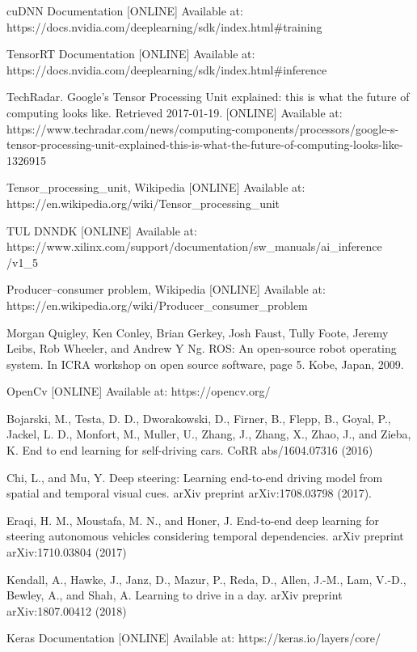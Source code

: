 \documentclass[conference]{IEEEtran}
\begin{document}
\begin{thebibliography}{00}
 cuDNN Documentation [ONLINE] Available at: https://docs.nvidia.com/deeplearning/sdk/index.html\#training

 TensorRT Documentation [ONLINE] Available at: https://docs.nvidia.com/deeplearning/sdk/index.html\#inference

 TechRadar. Google's Tensor Processing Unit explained: this is what the future of computing looks like. Retrieved 2017-01-19. [ONLINE] Available at: https://www.techradar.com/news/computing-components/processors/google-s-tensor-processing-unit-explained-this-is-what-the-future-of-computing-looks-like-1326915

 Tensor\_processing\_unit, Wikipedia [ONLINE] Available at: https://en.wikipedia.org/wiki/Tensor\_processing\_unit

 TUL DNNDK [ONLINE] Available at: https://www.xilinx.com/support/documentation/sw\_manuals/ai\_inference /v1\_5

 Producer–consumer problem, Wikipedia [ONLINE] Available at: https://en.wikipedia.org/wiki/Producer\_consumer\_problem

 Morgan Quigley, Ken Conley, Brian Gerkey, Josh Faust, Tully Foote, Jeremy Leibs, Rob Wheeler, and Andrew Y Ng. ROS: An open-source robot operating system. In ICRA workshop on open source software, page 5. Kobe, Japan, 2009.

 OpenCv [ONLINE] Available at: https://opencv.org/

 Bojarski, M., Testa, D. D., Dworakowski, D., Firner, B., Flepp, B., Goyal, P., Jackel, L. D., Monfort, M., Muller, U., Zhang, J., Zhang, X., Zhao, J., and Zieba, K. End to end learning for self-driving cars. CoRR abs/1604.07316 (2016)

 Chi, L., and Mu, Y. Deep steering: Learning end-to-end driving model from spatial and temporal visual cues. arXiv preprint arXiv:1708.03798 (2017).

 Eraqi, H. M., Moustafa, M. N., and Honer, J. End-to-end deep learning for steering autonomous vehicles considering temporal dependencies. arXiv preprint arXiv:1710.03804 (2017)

 Kendall, A., Hawke, J., Janz, D., Mazur, P., Reda, D., Allen, J.-M., Lam, V.-D., Bewley, A., and Shah, A. Learning to drive in a day. arXiv preprint arXiv:1807.00412 (2018)

 Keras Documentation [ONLINE] Available at: https://keras.io/layers/core/


\end{thebibliography}
\end{document}
